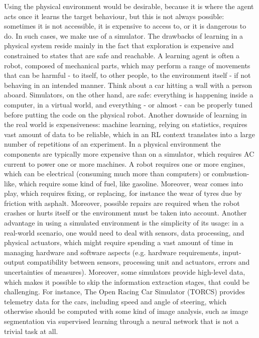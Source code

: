 Using the physical environment would be desirable, because it is where the agent acts once it learns the target behaviour, but this is not always possible: sometimes it is not accessible, it is expensive to access to, or it is dangerous to do. In such cases, we make use of a simulator. 
The drawbacks of learning in a physical system reside mainly in the fact that exploration is expensive and constrained to states that are safe and reachable. A learning agent is often a robot, composed of mechanical parts, which may perform a range of movements that can be harmful - to itself, to other people, to the environment itself - if not behaving in an intended manner. Think about a car hitting a wall with a person aboard. Simulators, on the other hand, are safe: everything is happening inside a computer, in a virtual world, and everything - or almost - can be properly tuned before putting the code on the physical robot. Another downside of learning in the real world is expensiveness: machine learning, relying on statistics, requires vast amount of data to be reliable, which in an RL context translates into a large number of repetitions of an experiment. In a physical environment the components are typically more expensive than on a simulator, which requires AC current to power one or more machines. A robot requires one or more engines, which can be electrical (consuming much more than computers) or combustion-like, which require some kind of fuel, like gasoline. Moreover, wear comes into play, which requires fixing, or replacing, for instance the wear of tyres due by friction with asphalt.  Moreover, possible repairs are required when the robot crashes or hurts itself or the environment must be taken into account. 
Another advantage in using a simulated environment is the simplicity of its usage: in a real-world scenario, one would need to deal with sensors, data processing, and physical actuators, which might require spending a vast amount of time in managing hardware and software aspects (e.g. hardware requirements, input-output compatibility between sensors, processing unit and actuators, errors and uncertainties of measures). Moreover, some simulators provide high-level data, which makes it possible to skip the information extraction stages, that could be challenging. For instance, The Open Racing Car Simulator (TORCS) provides telemetry data for the cars, including speed and angle of steering, which otherwise should be computed with some kind of image analysis, such as image segmentation via supervised learning through a neural network that is not a trivial task at all.
